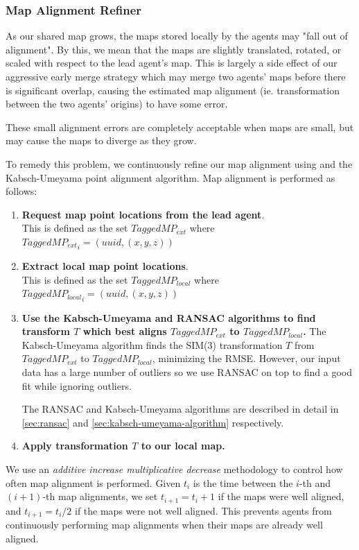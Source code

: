 \subsubsection{Map Alignment Refiner}
\label{sec:map-alignment-refiner}
As our shared map grows, the maps stored locally by the agents may "fall out of alignment". By this, we mean that the maps are slightly translated, rotated, or scaled with respect to the lead agent's map. This is largely a side effect of our aggressive early merge strategy which may merge two agents' maps before there is significant overlap, causing the estimated map alignment (ie. transformation between the two agents' origins) to have some error.

These small alignment errors are completely acceptable when maps are small, but may cause the maps to diverge as they grow.

To remedy this problem, we continuously refine our map alignment using  and the Kabsch-Umeyama point alignment algorithm. Map alignment is performed as follows:

\begin{enumerate}
    \item \textbf{Request map point locations from the lead agent}. \\
          This is defined as the set $TaggedMP_{ext}$ where ${TaggedMP_{ext}}_i = (uuid, (x, y, z))$
    \item \textbf{Extract local map point locations}. \\
          This is defined as the set $TaggedMP_{local}$ where ${TaggedMP_{local}}_i = (uuid, (x, y, z))$
    \item \textbf{Use the Kabsch-Umeyama and RANSAC algorithms to find transform $T$ which best aligns $TaggedMP_{ext}$ to $TaggedMP_{local}$.}
          The Kabsch-Umeyama algorithm finds the SIM(3) transformation $T$ from $TaggedMP_{ext}$ to $TaggedMP_{local}$, minimizing the RMSE. However, our input data has a large number of outliers so we use RANSAC on top to find a good fit while ignoring outliers.

          The RANSAC and Kabsch-Umeyama algorithms are described in detail in \autoref{sec:ransac} and \autoref{sec:kabsch-umeyama-algorithm} respectively.
    \item \textbf{Apply transformation $T$ to our local map.}
\end{enumerate}

We use an \textit{additive increase multiplicative decrease} methodology to control how often map alignment is performed. Given $t_i$ is the time between the $i$-th and $(i+1)$-th map alignments, we set $t_{i+1} = t_i + 1$ if the maps were well aligned, and $t_{i+1} = t_i / 2$ if the maps were not well aligned. This prevents agents from continuously performing map alignments when their maps are already well aligned.

